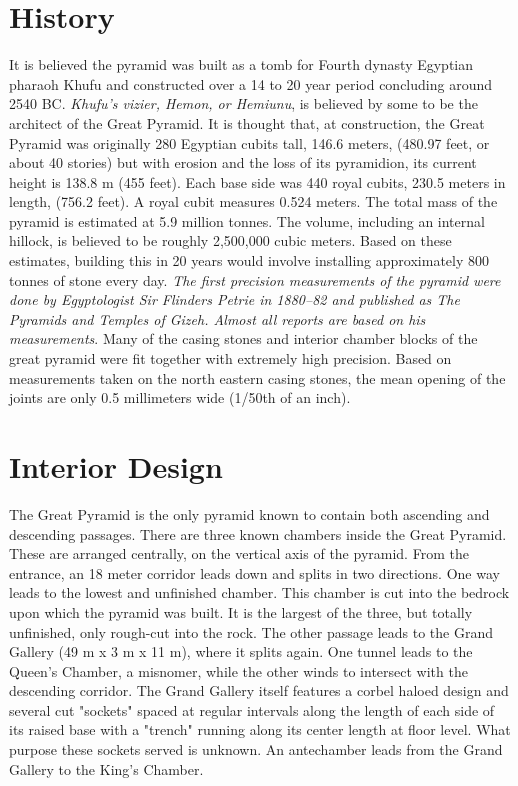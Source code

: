\documentclass[12 pt]{article}
\begin{document}
\section{History}
It is believed the pyramid was built as a tomb for Fourth dynasty Egyptian pharaoh Khufu and constructed over a 14 to 20 year period concluding around 2540 BC. {\itshape Khufu's vizier, Hemon, or Hemiunu}, is believed by some to be the architect of the Great Pyramid. It is thought that, at construction, the Great Pyramid was originally 280 Egyptian cubits tall, 146.6 meters, (480.97 feet, or about 40 stories) but with erosion and the loss of its pyramidion, its current height is 138.8 m (455 feet). Each base side was 440 royal cubits, 230.5 meters in length, (756.2 feet). A royal cubit measures 0.524 meters. The total mass of the pyramid is estimated at 5.9 million tonnes. The volume, including an internal hillock, is believed to be roughly 2,500,000 cubic meters. Based on these estimates, building this in 20 years would involve installing approximately 800 tonnes of stone every day. {\itshape The first precision measurements of the pyramid were done by Egyptologist Sir Flinders Petrie in 1880–82 and published as The Pyramids and Temples of Gizeh. Almost all reports are based on his measurements}. Many of the casing stones and interior chamber blocks of the great pyramid were fit together with extremely high precision. Based on measurements taken on the north eastern casing stones, the mean opening of the joints are only 0.5 millimeters wide (1/50th of an inch).

\section{Interior Design}
The Great Pyramid is the only pyramid known to contain both ascending and descending passages. There are three known chambers inside the Great Pyramid. These are arranged centrally, on the vertical axis of the pyramid. From the entrance, an 18 meter corridor leads down and splits in two directions. One way leads to the lowest and unfinished chamber. This chamber is cut into the bedrock upon which the pyramid was built. It is the largest of the three, but totally unfinished, only rough-cut into the rock. The other passage leads to the Grand Gallery (49 m x 3 m x 11 m), where it splits again. One tunnel leads to the Queen's Chamber, a misnomer, while the other winds to intersect with the descending corridor. The Grand Gallery itself features a corbel haloed design and several cut "sockets" spaced at regular intervals along the length of each side of its raised base with a "trench" running along its center length at floor level. What purpose these sockets served is unknown. An antechamber leads from the Grand Gallery to the King's Chamber.
\end{document}
